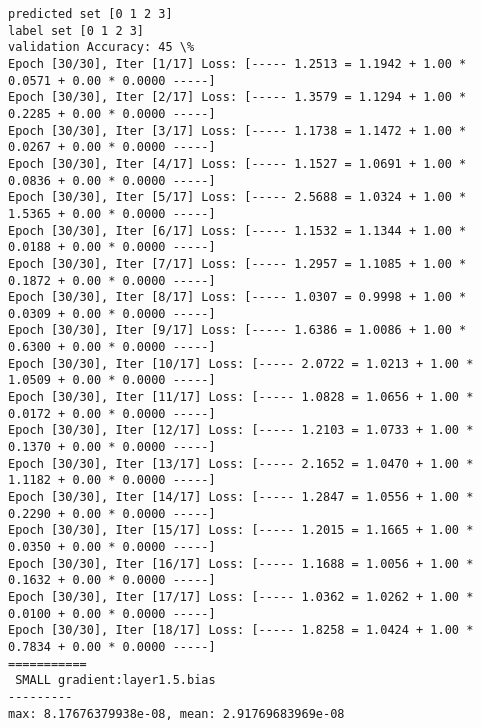 \documentclass[11pt]{article}
\begin{document}
    \begin{Verbatim}[commandchars=\\\{\}]
predicted set [0 1 2 3]
label set [0 1 2 3]
validation Accuracy: 45 \%
Epoch [30/30], Iter [1/17] Loss: [----- 1.2513 = 1.1942 + 1.00 * 0.0571 + 0.00 * 0.0000 -----]
Epoch [30/30], Iter [2/17] Loss: [----- 1.3579 = 1.1294 + 1.00 * 0.2285 + 0.00 * 0.0000 -----]
Epoch [30/30], Iter [3/17] Loss: [----- 1.1738 = 1.1472 + 1.00 * 0.0267 + 0.00 * 0.0000 -----]
Epoch [30/30], Iter [4/17] Loss: [----- 1.1527 = 1.0691 + 1.00 * 0.0836 + 0.00 * 0.0000 -----]
Epoch [30/30], Iter [5/17] Loss: [----- 2.5688 = 1.0324 + 1.00 * 1.5365 + 0.00 * 0.0000 -----]
Epoch [30/30], Iter [6/17] Loss: [----- 1.1532 = 1.1344 + 1.00 * 0.0188 + 0.00 * 0.0000 -----]
Epoch [30/30], Iter [7/17] Loss: [----- 1.2957 = 1.1085 + 1.00 * 0.1872 + 0.00 * 0.0000 -----]
Epoch [30/30], Iter [8/17] Loss: [----- 1.0307 = 0.9998 + 1.00 * 0.0309 + 0.00 * 0.0000 -----]
Epoch [30/30], Iter [9/17] Loss: [----- 1.6386 = 1.0086 + 1.00 * 0.6300 + 0.00 * 0.0000 -----]
Epoch [30/30], Iter [10/17] Loss: [----- 2.0722 = 1.0213 + 1.00 * 1.0509 + 0.00 * 0.0000 -----]
Epoch [30/30], Iter [11/17] Loss: [----- 1.0828 = 1.0656 + 1.00 * 0.0172 + 0.00 * 0.0000 -----]
Epoch [30/30], Iter [12/17] Loss: [----- 1.2103 = 1.0733 + 1.00 * 0.1370 + 0.00 * 0.0000 -----]
Epoch [30/30], Iter [13/17] Loss: [----- 2.1652 = 1.0470 + 1.00 * 1.1182 + 0.00 * 0.0000 -----]
Epoch [30/30], Iter [14/17] Loss: [----- 1.2847 = 1.0556 + 1.00 * 0.2290 + 0.00 * 0.0000 -----]
Epoch [30/30], Iter [15/17] Loss: [----- 1.2015 = 1.1665 + 1.00 * 0.0350 + 0.00 * 0.0000 -----]
Epoch [30/30], Iter [16/17] Loss: [----- 1.1688 = 1.0056 + 1.00 * 0.1632 + 0.00 * 0.0000 -----]
Epoch [30/30], Iter [17/17] Loss: [----- 1.0362 = 1.0262 + 1.00 * 0.0100 + 0.00 * 0.0000 -----]
Epoch [30/30], Iter [18/17] Loss: [----- 1.8258 = 1.0424 + 1.00 * 0.7834 + 0.00 * 0.0000 -----]
===========
 SMALL gradient:layer1.5.bias
---------
max: 8.17676379938e-08, mean: 2.91769683969e-08

    \end{Verbatim}

    \begin{center}
    \end{center}
    { \hspace*{\fill} \\}
    
    \begin{center}
    \end{center}
    { \hspace*{\fill} \\}
    
\end{document}
